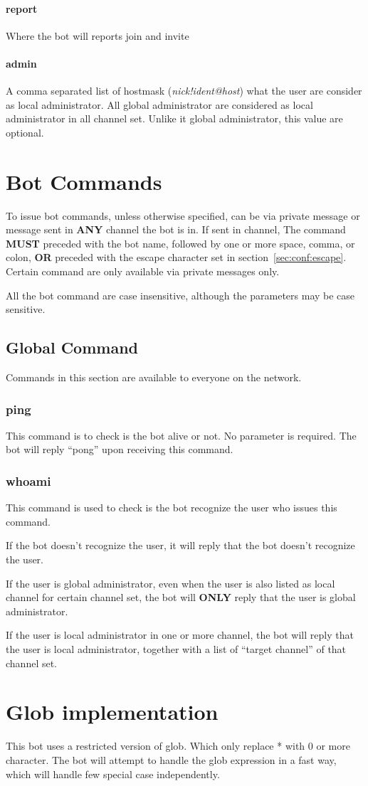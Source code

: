 \documentclass[a4paper,12pt,titlepage]{article}
\begin{document}
\paragraph{report} Where the bot will reports  join and invite
\paragraph{admin} A comma separated list of hostmask (\textit{nick!ident@host}) what the user are consider as local administrator. All global administrator are considered as local administrator in all channel set. Unlike it global administrator, this value are optional.
\section{Bot Commands}
To issue bot commands, unless otherwise specified, can be via private message or message sent in \textbf{ANY} channel the bot is in. If sent in channel, The command \textbf{MUST} preceded with the bot name, followed by one or more space, comma, or colon, \textbf{OR} preceded with the escape character set in section~\ref{sec:conf:escape}. Certain command are only available via private messages only.

All the bot command are case insensitive, although the parameters may be case sensitive.
\subsection{Global Command}
Commands in this section are available to everyone on the network.
\subsubsection{ping}
This command is to check is the bot alive or not. No parameter is required. The bot will reply ``pong'' upon receiving this command.
\subsubsection{whoami}
This command is used to check is the bot recognize the user who issues this command.

If the bot doesn't recognize the user, it will reply that the bot doesn't recognize the user.

If the user is global administrator, even when the user is also listed as local channel for certain channel set, the bot will \textbf{ONLY} reply that the user is global administrator.

If the user is local administrator in one or more channel, the bot will reply that the user is local administrator, together with a list of ``target channel'' of that channel set.
\section{Glob implementation}
This bot uses a restricted version of glob. Which only replace * with 0 or more character. The bot will attempt to handle the glob expression in a fast way, which will handle few special case independently.
\end{document}
